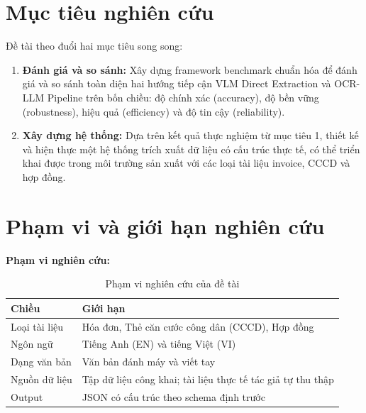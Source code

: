 ﻿\documentclass[12pt]{report}
\begin{document}
\section{Mục tiêu nghiên cứu}\label{sec:muctieu}


Đề tài theo đuổi hai mục tiêu song song:

\begin{enumerate}
    \item \textbf{Đánh giá và so sánh:} Xây dựng framework benchmark chuẩn hóa để đánh giá và so sánh toàn diện hai hướng tiếp cận VLM Direct Extraction và OCR-LLM Pipeline trên bốn chiều: độ chính xác (accuracy), độ bền vững (robustness), hiệu quả (efficiency) và độ tin cậy (reliability).

    \item \textbf{Xây dựng hệ thống:} Dựa trên kết quả thực nghiệm từ mục tiêu 1, thiết kế và hiện thực một hệ thống trích xuất dữ liệu có cấu trúc thực tế, có thể triển khai được trong môi trường sản xuất với các loại tài liệu invoice, CCCD và hợp đồng.
\end{enumerate}

\section{Phạm vi và giới hạn nghiên cứu}\label{sec:phamvi}

\noindent\textbf{Phạm vi nghiên cứu:}

\begin{table}[h]
\centering
\caption{Phạm vi nghiên cứu của đề tài}
\label{tab:phamvi}
\begin{tabular}{|l|p{9cm}|}
\hline
\textbf{Chiều} & \textbf{Giới hạn} \\ \hline
Loại tài liệu & Hóa đơn, Thẻ căn cước công dân (CCCD), Hợp đồng \\ \hline
Ngôn ngữ & Tiếng Anh (EN) và tiếng Việt (VI) \\ \hline
Dạng văn bản & Văn bản đánh máy và viết tay \\ \hline
Nguồn dữ liệu & Tập dữ liệu công khai; tài liệu thực tế tác giả tự thu thập \\ \hline
Output & JSON có cấu trúc theo schema định trước \\ \hline
\end{tabular}
\end{table}

\bigskip
\end{document}
